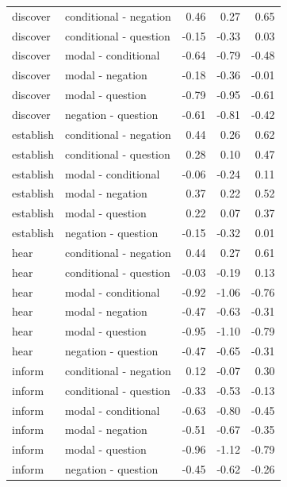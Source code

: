 \documentclass[a4paper,12pt,twoside]{article}
\begin{document}
\begin{longtable}{llrrr}
      discover & conditional - negation & 0.46 & 0.27 & 0.65 \\ 
      discover & conditional - question & -0.15 & -0.33 & 0.03 \\ 
      discover & modal - conditional & -0.64 & -0.79 & -0.48 \\ 
      discover & modal - negation & -0.18 & -0.36 & -0.01 \\ 
      discover & modal - question & -0.79 & -0.95 & -0.61 \\ 
      discover & negation - question & -0.61 & -0.81 & -0.42 \\ \midrule

      establish & conditional - negation & 0.44 & 0.26 & 0.62 \\ 
      establish & conditional - question & 0.28 & 0.10 & 0.47 \\ 
      establish & modal - conditional & -0.06 & -0.24 & 0.11 \\ 
      establish & modal - negation & 0.37 & 0.22 & 0.52 \\ 
      establish & modal - question & 0.22 & 0.07 & 0.37 \\ 
      establish & negation - question & -0.15 & -0.32 & 0.01 \\ \midrule

      hear & conditional - negation & 0.44 & 0.27 & 0.61 \\ 
      hear & conditional - question & -0.03 & -0.19 & 0.13 \\ 
      hear & modal - conditional & -0.92 & -1.06 & -0.76 \\ 
      hear & modal - negation & -0.47 & -0.63 & -0.31 \\ 
      hear & modal - question & -0.95 & -1.10 & -0.79 \\ 
      hear & negation - question & -0.47 & -0.65 & -0.31 \\ \midrule

      inform & conditional - negation & 0.12 & -0.07 & 0.30 \\ 
      inform & conditional - question & -0.33 & -0.53 & -0.13 \\ 
      inform & modal - conditional & -0.63 & -0.80 & -0.45 \\ 
      inform & modal - negation & -0.51 & -0.67 & -0.35 \\ 
      inform & modal - question & -0.96 & -1.12 & -0.79 \\ 
      inform & negation - question & -0.45 & -0.62 & -0.26 \\ \midrule


\end{longtable}
\end{document}
